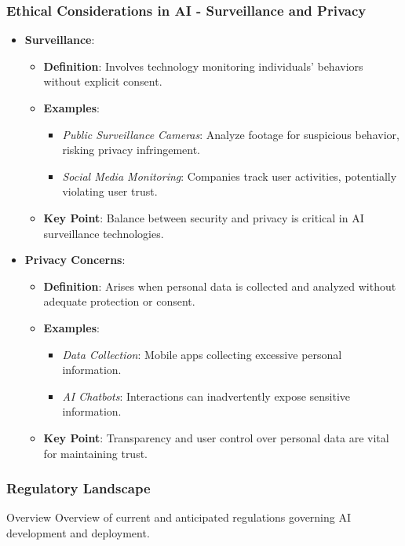 \documentclass[aspectratio=169]{beamer}
\begin{document}
\begin{frame}[fragile]
    \frametitle{Ethical Considerations in AI - Surveillance and Privacy}
    \begin{itemize}
        \item \textbf{Surveillance}:
        \begin{itemize}
            \item \textbf{Definition}: Involves technology monitoring individuals' behaviors without explicit consent.
            \item \textbf{Examples}:
                \begin{itemize}
                    \item \textit{Public Surveillance Cameras}: Analyze footage for suspicious behavior, risking privacy infringement.
                    \item \textit{Social Media Monitoring}: Companies track user activities, potentially violating user trust.
                \end{itemize}
            \item \textbf{Key Point}: Balance between security and privacy is critical in AI surveillance technologies.
        \end{itemize}

        \item \textbf{Privacy Concerns}:
        \begin{itemize}
            \item \textbf{Definition}: Arises when personal data is collected and analyzed without adequate protection or consent.
            \item \textbf{Examples}:
                \begin{itemize}
                    \item \textit{Data Collection}: Mobile apps collecting excessive personal information.
                    \item \textit{AI Chatbots}: Interactions can inadvertently expose sensitive information.
                \end{itemize}
            \item \textbf{Key Point}: Transparency and user control over personal data are vital for maintaining trust.
        \end{itemize}
    \end{itemize}
\end{frame}

\begin{frame}[fragile]
    \frametitle{Regulatory Landscape}
    \begin{block}{Overview}
        Overview of current and anticipated regulations governing AI development and deployment.
    \end{block}
\end{frame}
\end{document}
